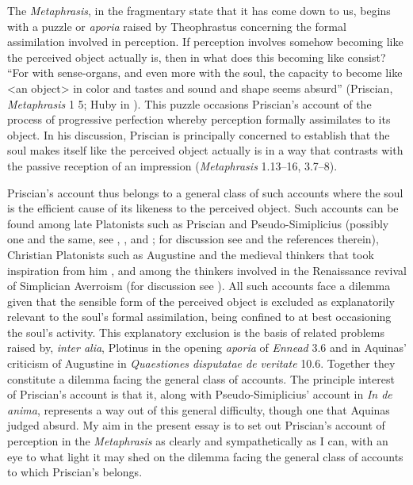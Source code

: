 \documentclass[12pt]{article}
\begin{document}
The \emph{Metaphrasis}, in the fragmentary state that it has come down to us, begins with a puzzle or \emph{aporia} raised by Theophrastus concerning the formal assimilation involved in perception. If perception involves somehow becoming like the perceived object actually is, then in what does this becoming like consist? ``For with sense-organs, and even more with the soul, the capacity to become like <an object> in color and tastes and sound and shape seems absurd'' (Priscian, \emph{Metaphrasis} 1 5; Huby in \citealt{Sorabji:1997ly}). This puzzle occasions Priscian's account of the process of progressive perfection whereby perception formally assimilates to its object. In his discussion, Priscian is principally concerned to establish that the soul makes itself like the perceived object actually is in a way that contrasts with the passive reception of an impression (\emph{Metaphrasis} 1.13--16, 3.7--8).

Priscian's account thus belongs to a general class of such accounts where the soul is the efficient cause of its likeness to the perceived object. Such accounts can be found among late Platonists such as Priscian and Pseudo-Simiplicius (possibly one and the same, see \citealt{Bossier:1972rp}, \citealt{Steel:1978th}, and \citealt[103--140]{Sorabji:1997ly}; for discussion see \citealt[18-24]{Finamore:2002yf} and the references therein), Christian Platonists such as Augustine and the medieval thinkers that took inspiration from him \citep{Silva:2014bh,Toivanen:2013ul}, and among the thinkers involved in the Renaissance revival of Simplician Averroism (for discussion see \citealt[chapter 8]{Spruit:1995fh}). All such accounts face a dilemma given that the sensible form of the perceived object is excluded as explanatorily relevant to the soul's formal assimilation, being confined to at best occasioning the soul's activity. This explanatory exclusion is the basis of related problems raised by, \emph{inter alia}, Plotinus in the opening \emph{aporia} of \emph{Ennead} 3.6 and in Aquinas' criticism of Augustine in \emph{Quaestiones disputatae de veritate} 10.6. Together they constitute a dilemma facing the general class of accounts. The principle interest of Priscian's account is that it, along with Pseudo-Simiplicius' account in \emph{In de anima}, represents a way out of this general difficulty, though one that Aquinas judged absurd. My aim in the present essay is to set out Priscian's account of perception in the \emph{Metaphrasis} as clearly and sympathetically as I can, with an eye to what light it may shed on the dilemma facing the general class of accounts to which Priscian's belongs.
\end{document}
